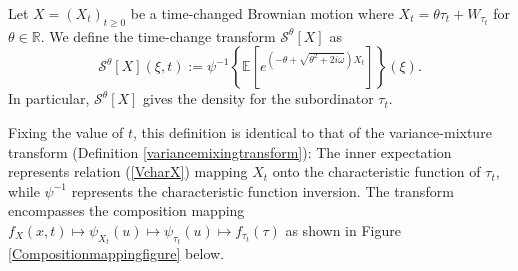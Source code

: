 \documentclass{article}
\begin{document}
\begin{definition}\label{timesubordinator transform}
    Let $X = (X_t)_{t\geq0}$ be a time-changed Brownian motion where $X_t = \theta \tau_t + W_{\tau_t}$ for $\theta\in\mathbb{R}$. We define the time-change transform $\mathcal{S}^\theta[X]$ as
    \begin{equation}\label{ShenoySubordinatorTransformTheta}
    \mathcal{S}^\theta\left[X\right](\xi,t) :=
    \psi^{-1}\left\{\mathbb{E}\left[e^{\left(-\theta+\sqrt{\theta^2+2i\omega}\right)X_t}\right]\right\}(\xi).
    \end{equation}
    In particular, $\mathcal{S}^\theta\left[X\right]$ gives the density for the subordinator $\tau_t$.
\end{definition}

\begin{remark}
    Fixing the value of $t$, this definition is identical to that of the variance-mixture transform (Definition \ref{variancemixingtransform}): The inner expectation represents relation (\ref{VcharX}) mapping $X_t$ onto the characteristic function of $\tau_t$, while $\psi^{-1}$ represents the characteristic function inversion. The transform encompasses the composition mapping $f_{X}(x,t)\mapsto \psi_{X_t}(u)\mapsto \psi_{\tau_t}(u)\mapsto f_{\tau_t}(\tau)$ as shown in Figure \ref{Compositionmappingfigure} below.
    \begin{figure}[h!]
        \centering
\end{figure}
\end{remark}
\end{document}
